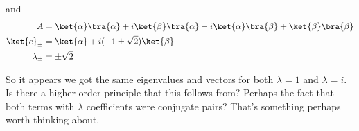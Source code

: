 and
\begin{align}\label{eqn:desaiDiracNotes:67in}
A &=
\ket{\alpha}\bra{\alpha}
+ i \ket{\beta}\bra{\alpha}
- i \ket{\alpha}\bra{\beta}
+ \ket{\beta}\bra{\beta} \\
\ket{e}_{\pm} &= \ket{\alpha} + i (-1 \pm \sqrt{2} ) \ket{\beta} \\
\lambda_{\pm} &= \pm \sqrt{2}
\end{align}

So it appears we got the same eigenvalues and vectors for both $\lambda = 1$ and $\lambda = i$.  Is there a higher order principle that this follows from?  Perhaps the fact that both terms with $\lambda$ coefficients were conjugate pairs?  That's something perhaps worth thinking about.

\EndArticle
